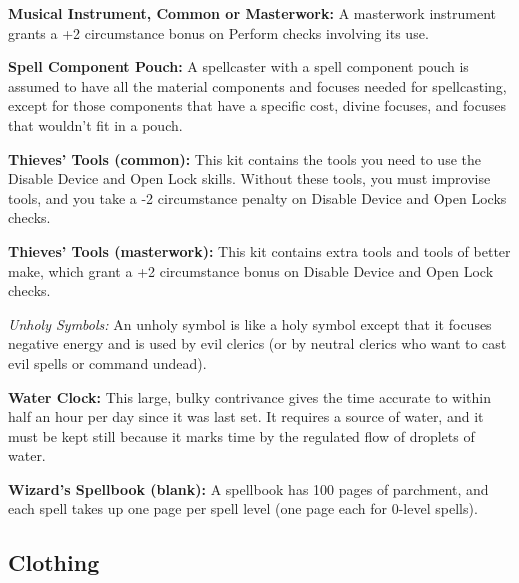 \textbf{Musical Instrument, Common or Masterwork:} A masterwork instrument grants 
a +2 circumstance bonus on Perform checks involving its use.

\textbf{Spell Component Pouch:} A spellcaster with a spell component pouch is assumed 
to have all the material components and focuses needed for spellcasting, except 
for those components that have a specific cost, divine focuses, and focuses that 
wouldn't fit in a pouch.

\textbf{Thieves' Tools (common):} This kit contains the tools you need to use the Disable 
Device and Open Lock skills. Without these tools, you must improvise tools, and 
you take a -2 circumstance penalty on Disable Device and Open Locks checks.

\textbf{Thieves' Tools (masterwork):} This kit contains extra tools and tools of 
better make, which grant a +2 circumstance bonus on Disable Device and Open Lock 
checks.

\textit{Unholy Symbols:} An unholy symbol is like a holy symbol except that it 
focuses negative energy and is used by evil clerics (or by neutral clerics who 
want to cast evil spells or command undead).

\textbf{Water Clock:} This large, bulky contrivance gives the time accurate to 
within half an hour per day since it was last set. It requires a source of water, 
and it must be kept still because it marks time by the regulated flow of droplets 
of water.

\textbf{Wizard's Spellbook (blank):} A spellbook has 100 pages of parchment, and 
each spell takes up one page per spell level (one page each for 0-level spells).

\subsection{Clothing}

